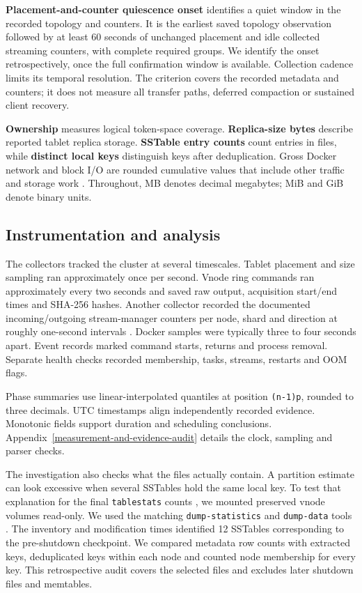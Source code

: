 \textbf{Placement-and-counter quiescence onset} identifies a quiet window in the recorded topology and counters. It is the earliest saved topology observation followed by at least 60 seconds of unchanged placement and idle collected streaming counters, with complete required groups. We identify the onset retrospectively, once the full confirmation window is available. Collection cadence limits its temporal resolution. The criterion covers the recorded metadata and counters; it does not measure all transfer paths, deferred compaction or sustained client recovery.

\textbf{Ownership} measures logical token-space coverage. \textbf{Replica-size bytes} describe reported tablet replica storage. \textbf{SSTable entry counts} count entries in files, while \textbf{distinct local keys} distinguish keys after deduplication. Gross Docker network and block I/O are rounded cumulative values that include other traffic and storage work \cite{r12}. Throughout, MB denotes decimal megabytes; MiB and GiB denote binary units.

\hypertarget{instrumentation-and-analysis}{%
\subsection{Instrumentation and
analysis}\label{instrumentation-and-analysis}}

The collectors tracked the cluster at several timescales. Tablet placement and size sampling ran approximately once per second. Vnode ring commands ran approximately every two seconds and saved raw output, acquisition start/end times and SHA-256 hashes. Another collector recorded the documented incoming/outgoing stream-manager counters per node, shard and direction at roughly one-second intervals \cite{r11}. Docker samples were typically three to four seconds apart. Event records marked command starts, returns and process removal. Separate health checks recorded membership, tasks, streams, restarts and OOM flags.

Phase summaries use linear-interpolated quantiles at position \texttt{(n-1)p}, rounded to three decimals. UTC timestamps align independently recorded evidence. Monotonic fields support duration and scheduling conclusions. Appendix~\ref{measurement-and-evidence-audit} details the clock, sampling and parser checks.

The investigation also checks what the files actually contain. A partition estimate can look excessive when several SSTables hold the same local key. To test that explanation for the final \texttt{tablestats} counts \cite{r4}, we mounted preserved vnode volumes read-only. We used the matching \texttt{dump-statistics} and \texttt{dump-data} tools \cite{r23}. The inventory and modification times identified 12 SSTables corresponding to the pre-shutdown checkpoint. We compared metadata row counts with extracted keys, deduplicated keys within each node and counted node membership for every key. This retrospective audit covers the selected files and excludes later shutdown files and memtables.

